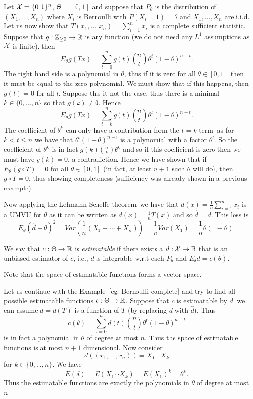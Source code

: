 \documentclass[twoside, a4paper, 10pt]{amsart}
\begin{document}
\begin{eg}\label{eg: Bernoulli complete} Let $\mathcal{X} = \{0,1\}^n$, $\Theta = [0,1]$ and suppose that $P_{\theta}$ is the distribution of $(X_1, \ldots, X_n)$ where $X_i$ is Bernoulli with $P(X_i = 1) = \theta$ and $X_1, \ldots, X_n$ are i.i.d. Let us now show that $T(x_1, \ldots, x_n) = \sum_{i=1}^n x_i$ is a complete sufficient statistic. Suppose that $g:\mathbb{Z}_{\geq 0} \to \mathbb{R}$ is any function (we do not need any $L^1$ assumptions as $\mathcal{X}$ is finite), then $$E_{\theta}g(Tx) = \sum_{t=0}^n g(t) \binom{n}{t} \theta^t(1-\theta)^{n-t}. $$ The right hand side is a polynomial in $\theta$, thus if it is zero for all $\theta \in [0,1]$ then it must be equal to the zero polynomial. We must show that if this happens, then $g(t) = 0$ for all $t$. Suppose this it not the case, thus there is a minimal $k \in \{0, \ldots, n\}$ so that $g(k) \neq 0$. Hence $$E_{\theta}g(Tx) = \sum_{t=k}^n g(t) \binom{n}{t} \theta^t(1-\theta)^{n-t}.$$ The coefficient of $\theta^{k}$ can only have a contribution form the $t=k$ term, as for $k<t\leq n$ we have that $\theta^t (1-\theta)^{n-t}$ is a polynomial with a factor $\theta^{t}$. So the coefficient of $\theta^k$ is in fact $g(k) \binom{n}{k} \theta^{k}$ and so if this coefficient is zero then we must have $g(k) = 0$, a contradiction. Hence we have shown that if $E_{\theta}(g \circ T) = 0$ for all $\theta \in [0,1]$ (in fact, at least $n+1$ such $\theta$ will do), then $g \circ T = 0$, thus showing completeness (sufficiency was already shown in a previous example).

Now applying the Lehmann-Scheffe theorem, we have that $d(x) = \frac{1}{n} \sum_{i=1}^n x_i$ is a UMVU for $\theta$ as it can be written as $d(x) = \frac{1}{n}T(x)$ and so $\hat{d} = d$. This loss is $$E_{\theta}(\hat{d} - \theta)^2 = Var(\frac{1}{n}(X_1 + \cdots + X_n)) = \frac{1}{n} Var(X_1) = \frac{1}{n}\theta(1-\theta).$$

\end{eg}

\begin{mydef} We say that $c:\Theta \to \mathbb{R}$ is \textit{estimatable} if there exists a $d:\mathcal{X} \to \mathbb{R}$ that is an unbiased estimator of $c$, i.e., $d$ is integrable w.r.t each $P_{\theta}$ and $E_{\theta}d = c(\theta)$. \end{mydef}

Note that the space of estimatable functions forms a vector space.

\begin{eg} Let us continue with the Example~\ref{eg: Bernoulli complete} and try to find all possible estimatable functions $c:\Theta \to \mathbb{R}$. Suppose that $c$ is estimatable by $d$, we can assume $d = d(T)$ is a function of $T$ (by replacing $d$ with $\hat{d}$). Thus $$c(\theta) = \sum_{t=0}^n d(t) \binom{n}{t} \theta^t(1-\theta)^{n-t}$$ is in fact a polynomial in $\theta$ of degree at most $n$. Thus the space of estimatable functions is at most $n+1$ dimensional. Now consider $$d((x_1, \ldots, x_n)) = X_1\ldots X_k$$ for $k \in \{0,\ldots, n\}$. We have $$E(d) = E(X_1 \cdots X_k) = E(X_1)^k = \theta^k.$$  Thus the estimatable functions are exactly the polynomials in $\theta$ of degree at most $n$. \end{eg}
\end{document}
